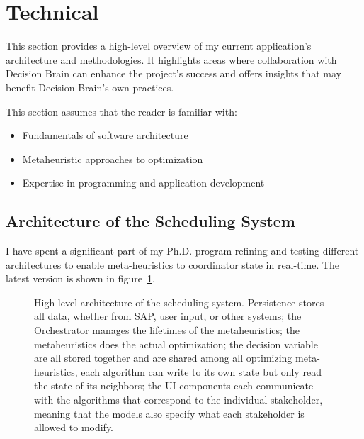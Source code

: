 \newpage
\section{Technical}
\label{sec:technical}
This section provides a high-level overview of my current application's
architecture and methodologies. It highlights areas where collaboration with
Decision Brain can enhance the project's success and offers insights that may
benefit Decision Brain's own practices. 

This section assumes that the reader is familiar with:
\begin{itemize}
	\item Fundamentals of software architecture
	\item Metaheuristic approaches to optimization
	\item Expertise in programming and application development
\end{itemize}

\subsection*{Architecture of the Scheduling System}
I have spent a significant part of my Ph.D. program refining and testing different architectures to enable
meta-heuristics to coordinator state in real-time. The latest version is shown in figure~\ref{fig:ordinator:architecture}.

\begin{figure}[H]
	\centering
	

	\caption{
		High level architecture of the scheduling system. Persistence stores
		all data, whether from SAP, user input, or other systems; the Orchestrator manages the lifetimes of the 
		metaheuristics; the metaheuristics does the actual optimization;
		the decision variable are all stored together and are shared among all optimizing meta-heuristics, 
		each algorithm can write to its own state but only read the state of its neighbors; the UI components
		each communicate with the algorithms that correspond to the individual stakeholder, meaning that the 
		models also specify what each stakeholder is allowed to modify.
	}
	\label{fig:ordinator:architecture}
\end{figure}

